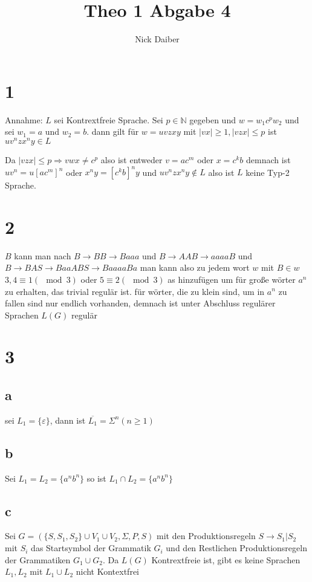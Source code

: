 \documentclass{article}
\title{Theo 1 Abgabe 4}
\author{Nick Daiber}
\newcommand{\N}{\mathbb{N}}
\begin{document}
\maketitle
\section*{1}
Annahme: $L$ sei Kontrextfreie Sprache.
Sei $p\in \N$ gegeben und $w = w_1 c^pw_2$ und sei $w_1 = a$ und $w_2=b$.
dann gilt für $w=uvzxy$ mit $|vx|\geq 1, |vzx|\leq p$ 
ist $uv^nzx^ny\in L$

Da $|vzx|\leq p\Rightarrow vwx\neq c^p$ also ist entweder $v=ac^m$ oder $x=c^kb$
demnach ist $uv^n =u[ac^m]^n$ oder $x^ny=[c^kb]^ny$ und $uv^nzx^ny\notin L$
also ist $L$ keine Typ-2 Sprache.
\section*{2}
$B$ kann man nach $B\rightarrow BB\rightarrow Baaa$ und $B\rightarrow AAB\rightarrow aaaaB$ und
$B\rightarrow BAS \rightarrow BaaABS\rightarrow BaaaaBa$
man kann also zu jedem wort $w$ mit $B\in w$ $3, 4 \equiv 1 (\mod 3)$ oder $5 \equiv 2 (\mod 3)$ as
hinzufügen um für große wörter $a^n$ zu erhalten, das trivial regulär ist.
für wörter, die zu klein sind, um in $a^n$ zu fallen sind nur endlich vorhanden,
demnach ist unter Abschluss regulärer Sprachen $L(G)$ regulär
\section*{3}
\subsection*{a}
sei $L_1=\{\varepsilon\}$, dann ist $\overline{L_1}=\Sigma^n (n\geq 1)$
\subsection*{b}
Sei $L_1 = L_2 = \{a^nb^n\}$ so ist $L_1\cap L_2 = \{a^nb^n\}$
\subsection*{c}
Sei $G=(\{S, S_1, S_2\}\cup V_1 \cup V_2, \Sigma, P, S)$ mit den Produktionsregeln
$S\rightarrow S_1|S_2$ mit $S_i$ das Startsymbol der Grammatik $G_i$ und den Restlichen
Produktionsregeln der Grammatiken $G_1 \cup G_2$.
Da $L(G)$ Kontrextfreie ist, gibt es keine Sprachen $L_1, L_2$ mit $L_1 \cup L_2$ nicht
Kontextfrei
\end{document}
